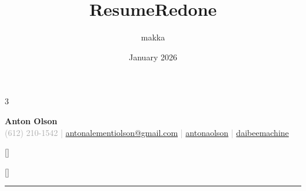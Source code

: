 \documentclass{article}
\title{ResumeRedone}
\author{makka }
\date{January 2026}
\newcommand{\makedivider}[1]{\textcolor{black!20}{\rule{\textwidth}{#1}}}%
\begin{document}
\begin{paracol}{3}    
        
    \begin{yellowline}
    \end{yellowline}%
    \begin{yellowline}
    \end{yellowline}%
    \switchcolumn

    \begin{tcolorbox}[colback=white, sharp corners, colframe=white, top=0.5in]%
        \centering
        {\fontsize{60}{8}\selectfont
        \textbf{Anton Olson}}\\[0.25in]
        \textcolor{darkgray}{\fontsize{12}{8}\selectfont
        \raisebox{-0.1\height}{\faPhone}\hspace{0.075in}(612) 210-1542
        |
        \raisebox{-0.1\height}{\faEnvelope}\hspace{0.075in}\href{mailto:antonalementiolson@gmail.com}{antonalementiolson@gmail.com}
        |
        \raisebox{-0.1\height}{\faLinkedin}\hspace{0.075in}\href{https://www.linkedin.com/in/antonaolson/}{antonaolson} 
        |
        \raisebox{-0.1\height}{\faGithub}\hspace{0.075in}\href{https://github.com/daibeemachine}{daibeemachine} 
        }
    \end{tcolorbox}%

    \begin{tcolorbox}[colback=white, left=0.5in, right =0.5in, top=0.1in, breakable, colframe=white]
    \titleformat{\section}{\normalfont\fontsize{20}{8}\selectfont\bfseries}{}{}{\vspace{0.2in}}[]
    \titleformat{\subsection}{\normalfont\fontsize{14}{8}\selectfont\bfseries}{}{}{}[]
    \titlespacing{\subsection}{0in}{0.1in}{0.1in}
    \vspace{0.1in}
    \makedivider{0.05in}
    

\end{tcolorbox}
\end{paracol}
\end{document}

